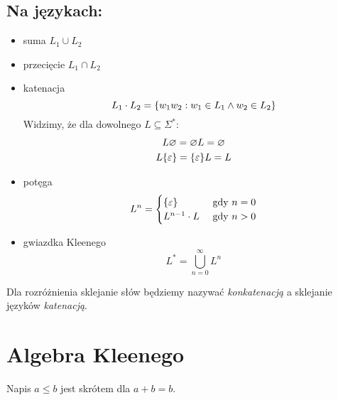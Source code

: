 \subsection{Na językach:}
\begin{itemize}
    \item suma \( L_1 \cup L_2 \)
    \item przecięcie \( L_1 \cap L_2 \)
    \item katenacja
        \begin{equation*}
            L_1\cdot L_2 = \set{w_1w_2 : w_1 \in L_1 \land w_2 \in L_2}
        \end{equation*}
        Widzimy, że dla dowolnego \(L \subseteq \Sigma^*\):
        \begin{gather*}
            L\emptyset = \emptyset L = \emptyset\\
            L\set{\eps} = \set{\eps}L = L
        \end{gather*}
    \item potęga
        \begin{equation*}
            L^n = \begin{cases}
                \set{\varepsilon} & \text{ gdy } n = 0 \\
                L^{n-1} \cdot L & \text{ gdy } n > 0
            \end{cases}
        \end{equation*}
    \item gwiazdka Kleenego 
        \begin{equation*}
            L^* = \bigcup_{n=0}^\infty L^n
        \end{equation*}
\end{itemize}

Dla rozróżnienia sklejanie słów będziemy nazywać \textit{konkatenacją} a sklejanie języków \textit{katenacją}.



\section{Algebra Kleenego}
Napis \(a \leq b\) jest skrótem dla \(a + b = b\).

